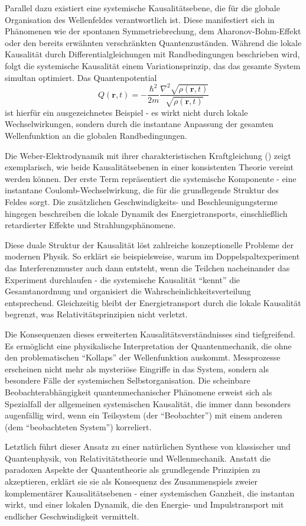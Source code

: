Parallel dazu existiert eine systemische Kausalitätsebene, die für die globale Organisation des Wellenfeldes verantwortlich ist. Diese manifestiert sich in Phänomenen wie der
spontanen Symmetriebrechung, dem Aharonov-Bohm-Effekt oder den bereits erwähnten verschränkten Quantenzuständen. Während die lokale Kausalität durch Differentialgleichungen mit
Randbedingungen beschrieben wird, folgt die systemische Kausalität einem Variationsprinzip, das das gesamte System simultan optimiert.
Das Quantenpotential \cite{bohm1952}
\begin{equation}
    \label{eq:bohm_potenzial}
    Q(\mathbf{r},t) = -\frac{\hbar^2}{2m} \frac{\nabla^2 \sqrt{\rho(\mathbf{r},t)}}{\sqrt{\rho(\mathbf{r},t)}}
\end{equation}
ist hierfür ein ausgezeichnetes Beispiel - es wirkt nicht durch lokale Wechselwirkungen, sondern durch die instantane Anpassung der gesamten
Wellenfunktion an die globalen Randbedingungen.

Die Weber-Elektrodynamik mit ihrer charakteristischen Kraftgleichung () zeigt exemplarisch, wie beide Kausalitätsebenen in einer konsistenten Theorie vereint werden können.
Der erste Term repräsentiert die systemische Komponente - eine instantane Coulomb-Wechselwirkung, die für die grundlegende Struktur des Feldes sorgt. Die zusätzlichen Geschwindigkeits- und
Beschleunigungsterme hingegen beschreiben die lokale Dynamik des Energietransports, einschließlich retardierter Effekte und Strahlungsphänomene.

Diese duale Struktur der Kausalität löst zahlreiche konzeptionelle Probleme der modernen Physik. So erklärt sie beispielsweise, warum im Doppelspaltexperiment das Interferenzmuster
auch dann entsteht, wenn die Teilchen nacheinander das Experiment durchlaufen - die systemische Kausalität \enquote{kennt} die Gesamtanordnung und organisiert die Wahrscheinlichkeitsverteilung
entsprechend. Gleichzeitig bleibt der Energietransport durch die lokale Kausalität begrenzt, was Relativitätsprinzipien nicht verletzt.

Die Konsequenzen dieses erweiterten Kausalitätsverständnisses sind tiefgreifend. Es ermöglicht eine physikalische Interpretation der Quantenmechanik, die ohne den problematischen
\enquote{Kollaps} der Wellenfunktion auskommt. Messprozesse erscheinen nicht mehr als mysteriöse Eingriffe in das System, sondern als besondere Fälle der systemischen Selbstorganisation.
Die scheinbare Beobachterabhängigkeit quantenmechanischer Phänomene erweist sich als Spezialfall der allgemeinen systemischen Kausalität, die immer dann besonders augenfällig wird, wenn
ein Teilsystem (der \enquote{Beobachter}) mit einem anderen (dem \enquote{beobachteten System}) korreliert.

Letztlich führt dieser Ansatz zu einer natürlichen Synthese von klassischer und Quantenphysik, von Relativitätstheorie und Wellenmechanik. Anstatt die paradoxen Aspekte der Quantentheorie
als grundlegende Prinzipien zu akzeptieren, erklärt sie sie als Konsequenz des Zusammenspiels zweier komplementärer Kausalitätsebenen - einer systemischen Ganzheit, die instantan wirkt,
und einer lokalen Dynamik, die den Energie- und Impulstransport mit endlicher Geschwindigkeit vermittelt.
